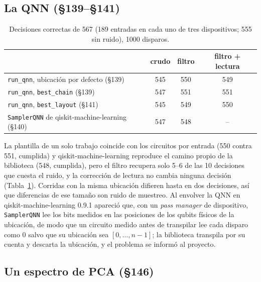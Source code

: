 \documentclass[11pt]{article}
\begin{document}
\subsection{La QNN (§139--§141)}

\begin{table}[h]
\centering\small
\begin{tabular}{lccc}
\toprule
 & crudo & filtro & filtro + lectura\\
\midrule
\texttt{run\_qnn}, ubicación por defecto (§139) & 545 & 550 & 549\\
\texttt{run\_qnn}, \texttt{best\_chain} (§139) & 547 & 551 & 551\\
\texttt{run\_qnn}, \texttt{best\_layout} (§141) & 545 & 549 & 550\\
\texttt{SamplerQNN} de qiskit-machine-learning (§140) & 547 & 548 & --\\
\bottomrule
\end{tabular}
\caption{Decisiones correctas de 567 (189 entradas en cada uno de tres dispositivos; 555 sin ruido), 1000
disparos.}
\label{tab:qnn}
\end{table}

La plantilla de un solo trabajo coincide con los circuitos por entrada (550 contra 551, cumplida) y
qiskit-machine-learning reproduce el camino propio de la biblioteca (548, cumplida), pero el filtro recupera
solo 5--6 de las 10 decisiones que cuesta el ruido, y la corrección de lectura no cambia ninguna decisión
(Tabla~\ref{tab:qnn}). Corridas con la misma ubicación difieren hasta en dos decisiones, así que diferencias
de ese tamaño son ruido de muestreo. Al envolver la QNN en qiskit-machine-learning 0.9.1 apareció que, con un
\emph{pass manager} de dispositivo, \texttt{SamplerQNN} lee los bits medidos en las posiciones de los qubits
físicos de la ubicación, de modo que un circuito medido antes de transpilar lee cada disparo como 0 salvo
que su ubicación sea $[0,\dots,n-1]$; la biblioteca transpila por su cuenta y descarta la ubicación, y el
problema se informó al proyecto.

\subsection{Un espectro de PCA (§146)}
\end{document}
